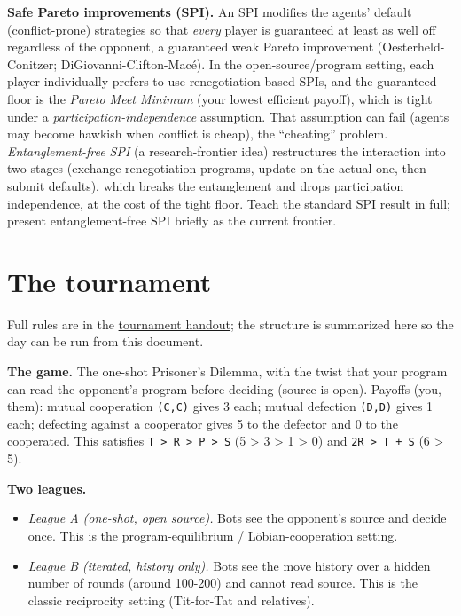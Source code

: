 \documentclass[11pt]{article}
\begin{document}
\textbf{Safe Pareto improvements (SPI).} An SPI modifies the agents' default (conflict-prone) strategies so that \emph{every} player is guaranteed at least as well off regardless of the opponent, a guaranteed weak Pareto improvement (Oesterheld-Conitzer; DiGiovanni-Clifton-Macé). In the open-source/program setting, each player individually prefers to use renegotiation-based SPIs, and the guaranteed floor is the \emph{Pareto Meet Minimum} (your lowest efficient payoff), which is tight under a \emph{participation-independence} assumption. That assumption can fail (agents may become hawkish when conflict is cheap), the ``cheating'' problem. \emph{Entanglement-free SPI} (a research-frontier idea) restructures the interaction into two stages (exchange renegotiation programs, update on the actual one, then submit defaults), which breaks the entanglement and drops participation independence, at the cost of the tight floor. Teach the standard SPI result in full; present entanglement-free SPI briefly as the current frontier.

\section{The tournament}
Full rules are in the \href{https://iliad.au.pe/sessions/decision-theory/handout.html}{tournament handout}; the structure is summarized here so the day can be run from this document.

\textbf{The game.} The one-shot Prisoner's Dilemma, with the twist that your program can read the opponent's program before deciding (source is open). Payoffs (you, them): mutual cooperation \texttt{(C,C)} gives 3 each; mutual defection \texttt{(D,D)} gives 1 each; defecting against a cooperator gives 5 to the defector and 0 to the cooperated. This satisfies \texttt{T\ \textgreater{}\ R\ \textgreater{}\ P\ \textgreater{}\ S} (5 \textgreater{} 3 \textgreater{} 1 \textgreater{} 0) and \texttt{2R\ \textgreater{}\ T\ +\ S} (6 \textgreater{} 5).

\textbf{Two leagues.}

\begin{itemize}
\item
  \emph{League A (one-shot, open source).} Bots see the opponent's source and decide once. This is the program-equilibrium / Löbian-cooperation setting.
\item
  \emph{League B (iterated, history only).} Bots see the move history over a hidden number of rounds (around 100-200) and cannot read source. This is the classic reciprocity setting (Tit-for-Tat and relatives).
\end{itemize}
\end{document}
